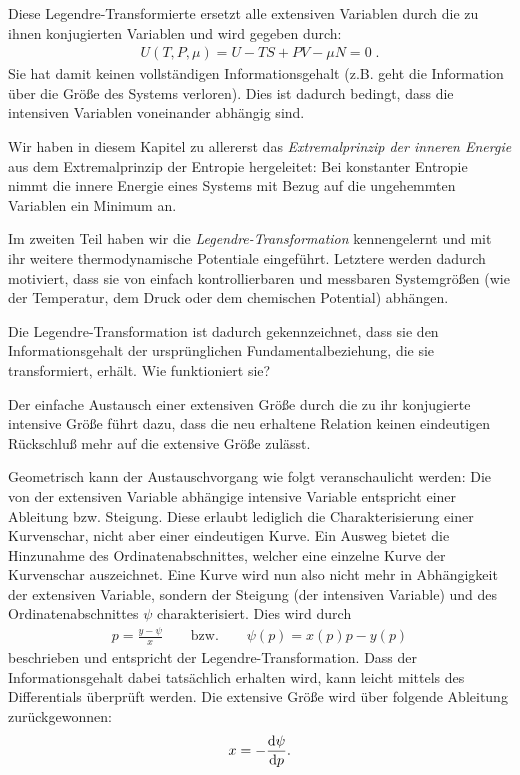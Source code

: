    \begin{formal}
    
        Diese Legendre-Transformierte ersetzt alle extensiven Variablen durch die zu ihnen konjugierten Variablen und wird gegeben durch:
        \begin{align*}
            \boxed{U\left(T,P,\mu\right)=U-TS+PV-\mu N=0}\;.
        \end{align*}
        Sie hat damit keinen vollständigen Informationsgehalt (z.B. geht die Information über die Größe des Systems verloren). Dies ist dadurch bedingt, dass die intensiven Variablen voneinander abhängig sind.
    \end{formal}
    \begin{summary}
        Wir haben in diesem Kapitel zu allererst das \emph{Extremalprinzip der inneren Energie} aus dem Extremalprinzip der Entropie hergeleitet: Bei konstanter Entropie nimmt die innere Energie eines Systems mit Bezug auf die ungehemmten Variablen ein Minimum an. 

        Im zweiten Teil haben wir die \emph{Legendre-Transformation} kennengelernt und mit ihr weitere thermodynamische Potentiale eingeführt. Letztere werden dadurch motiviert, dass sie von einfach kontrollierbaren und messbaren Systemgrößen (wie der Temperatur, dem Druck oder dem chemischen Potential) abhängen.

        Die Legendre-Transformation ist dadurch gekennzeichnet, dass sie den Informationsgehalt der ursprünglichen Fundamentalbeziehung, die sie transformiert, erhält. Wie funktioniert sie? 
        
        Der einfache Austausch einer extensiven Größe durch die zu ihr konjugierte intensive Größe führt dazu, dass die neu erhaltene Relation keinen eindeutigen Rückschluß mehr auf die extensive Größe zulässt. 
        
        Geometrisch kann der Austauschvorgang wie folgt veranschaulicht werden: Die von der extensiven Variable abhängige intensive Variable entspricht einer Ableitung bzw. Steigung. Diese erlaubt lediglich die Charakterisierung einer Kurvenschar, nicht aber einer eindeutigen Kurve. Ein Ausweg bietet die Hinzunahme des Ordinatenabschnittes, welcher eine einzelne Kurve der Kurvenschar auszeichnet. Eine Kurve wird nun also nicht mehr in Abhängigkeit der extensiven Variable, sondern der Steigung (der intensiven Variable) und des Ordinatenabschnittes $\psi$ charakterisiert. Dies wird durch 
        \begin{align*}
            p=\frac{y-\psi}{x} \qquad \mathrm{bzw.} \qquad \psi(p) =x(p)p-y(p)
        \end{align*} 
        beschrieben und entspricht der Legendre-Transformation. 
        Dass der Informationsgehalt dabei tatsächlich erhalten wird, kann leicht mittels des Differentials überprüft werden. Die extensive Größe wird über folgende Ableitung zurückgewonnen:
        \begin{align*}
            x=-\frac{\mathop{}\!\mathrm{d} \psi}{\mathop{}\!\mathrm{d} p}.
        \end{align*} 


\end{summary}
